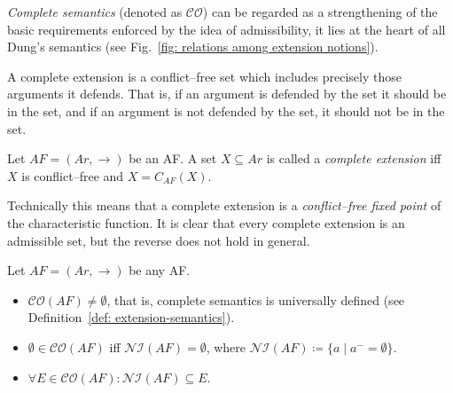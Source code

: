 
\textit{Complete semantics} (denoted as $\mathcal{CO}$) can be regarded as a strengthening of the basic 
requirements enforced by the idea of admissibility, 
it lies at the heart of all Dung's semantics (see Fig.~\ref{fig: relations among extension notions}).


A complete extension is a conflict--free set which includes precisely those arguments it defends. 
That is, 
if an argument is defended by the set it should be in the set, 
and if an argument is not defended by the set, it should not be in the set.


\begin{df}
    Let $AF=(Ar,\to)$ be an AF. 
    A set $X \subseteq Ar$ is called a \textit{complete extension} iff $X$ is conflict--free and $X = C_{AF}(X)$. 
\end{df}


Technically this means that a complete extension is a \textit{conflict--free fixed point} of the characteristic function.
% 
It is clear that every complete extension is an admissible set, 
but the reverse does not hold in general.
% 



\begin{prop} Let $AF = (Ar,\to)$ be any AF.
    \begin{itemize}[itemsep=5pt,parsep=5pt,leftmargin=3em,topsep=5pt]
        \item $\mathcal{CO}(AF) \not= \emptyset$, 
        that is, 
        complete semantics is universally defined (see Definition~\ref{def: extension-semantics}).


        \item 
        $\emptyset \in \mathcal{CO}(AF)$ iff $\mathcal{NI}(AF) = \emptyset$, 
        where $\mathcal{NI}(AF) \coloneqq \{a \mid a^- = \emptyset\}$.

        
        \item 
        $\forall E \in \mathcal{CO}(AF): \mathcal{NI}(AF) \subseteq E$.
    \end{itemize}
\end{prop}






